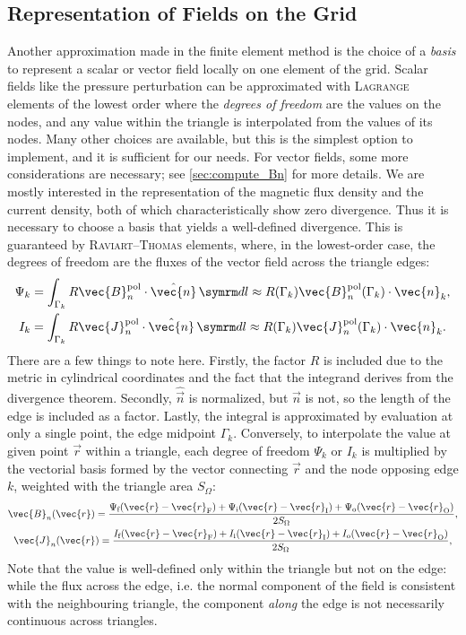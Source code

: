 \subsection{Representation of Fields on the Grid}
\label{sec:dofs}

Another approximation made in the finite element method is the choice of a \emph{basis} to represent a scalar or vector field locally on one element of the grid. Scalar fields like the pressure perturbation can be approximated with \textsc{Lagrange} elements of the lowest order where the \emph{degrees of freedom} are the values on the nodes, and any value within the triangle is interpolated from the values of its nodes. Many other choices are available, but this is the simplest option to implement, and it is sufficient for our needs. For vector fields, some more considerations are necessary; see \cref{sec:compute_Bn} for more details. We are mostly interested in the representation of the magnetic flux density and the current density, both of which characteristically show zero divergence. Thus it is necessary to choose a basis that yields a well-defined divergence. This is guaranteed by \textsc{Raviart}--\textsc{Thomas} elements, where, in the lowest-order case, the degrees of freedom are the fluxes of the vector field across the triangle edges:
\begin{gather}
  \Psi_{k} = \int_{\Gamma_{k}} R \vec{B}_{n}^{\pol} \cdot \hat{\vec{n}} \, \diff l \approx R (\Gamma_{k}) \vec{B}_{n}^{\pol} (\Gamma_{k}) \cdot \vec{n}_{k}, \label{eq:Psi_k} \\
  I_{k} = \int_{\Gamma_{k}} R \vec{J}_{n}^{\pol} \cdot \hat{\vec{n}} \, \diff l \approx R (\Gamma_{k}) \vec{J}_{n}^{\pol} (\Gamma_{k}) \cdot \vec{n}_{k}. \label{eq:I_k}
\end{gather}%
There are a few things to note here. Firstly, the factor $R$ is included due to the metric in cylindrical coordinates and the fact that the integrand derives from the divergence theorem. Secondly, $\hat{\vec{n}}$ is normalized, but $\vec{n}$ is not, so the length of the edge is included as a factor. Lastly, the integral is approximated by evaluation at only a single point, the edge midpoint $\Gamma_{k}$. Conversely, to interpolate the value at given point $\vec{r}$ within a triangle, each degree of freedom $\Psi_{k}$ or $I_{k}$ is multiplied by the vectorial basis formed by the vector connecting $\vec{r}$ and the node opposing edge $k$, weighted with the triangle area $S_{\Omega}$:
\begin{gather}
  \vec{B}_{n} (\vec{r}) = \frac{\Psi_{\fs} (\vec{r} - \vec{r}_{\vfs}) + \Psi_{\inw} (\vec{r} - \vec{r}_{\vinw}) + \Psi_{\out} (\vec{r} - \vec{r}_{\vout})}{2 S_{\Omega}}, \\
  \vec{J}_{n} (\vec{r}) = \frac{I_{\fs} (\vec{r} - \vec{r}_{\vfs}) + I_{\inw} (\vec{r} - \vec{r}_{\vinw}) + I_{\out} (\vec{r} - \vec{r}_{\vout})}{2 S_{\Omega}},
\end{gather}
Note that the value is well-defined only within the triangle but not on the edge: while the flux across the edge, i.e. the normal component of the field is consistent with the neighbouring triangle, the component \emph{along} the edge is not necessarily continuous across triangles.

